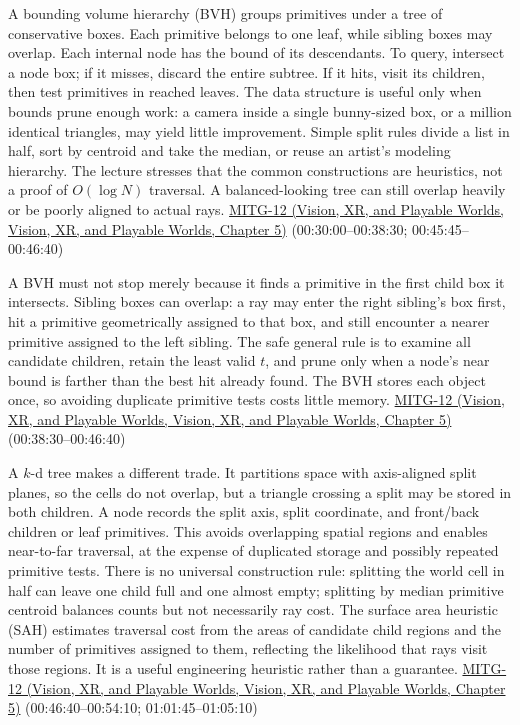 A bounding volume hierarchy (BVH) groups primitives under a tree of conservative boxes. Each primitive belongs to one leaf, while sibling boxes may overlap. Each internal node has the bound of its descendants. To query, intersect a node box; if it misses, discard the entire subtree. If it hits, visit its children, then test primitives in reached leaves. The data structure is useful only when bounds prune enough work: a camera inside a single bunny-sized box, or a million identical triangles, may yield little improvement. Simple split rules divide a list in half, sort by centroid and take the median, or reuse an artist's modeling hierarchy. The lecture stresses that the common constructions are heuristics, not a proof of \(O(\log N)\) traversal. A balanced-looking tree can still overlap heavily or be poorly aligned to actual rays. \href{../07-Vision-XR-and-Playable-Worlds/main.pdf\#nameddest=04-visual-computing-ii-ch036-mitg-12---ray-tracing-ii}{MITG-12 (Vision, XR, and Playable Worlds, Vision, XR, and Playable Worlds, Chapter 5)} (00:30:00--00:38:30; 00:45:45--00:46:40)

A BVH must not stop merely because it finds a primitive in the first child box it intersects. Sibling boxes can overlap: a ray may enter the right sibling's box first, hit a primitive geometrically assigned to that box, and still encounter a nearer primitive assigned to the left sibling. The safe general rule is to examine all candidate children, retain the least valid \(t\), and prune only when a node's near bound is farther than the best hit already found. The BVH stores each object once, so avoiding duplicate primitive tests costs little memory. \href{../07-Vision-XR-and-Playable-Worlds/main.pdf\#nameddest=04-visual-computing-ii-ch036-mitg-12---ray-tracing-ii}{MITG-12 (Vision, XR, and Playable Worlds, Vision, XR, and Playable Worlds, Chapter 5)} (00:38:30--00:46:40)

A \(k\)-d tree makes a different trade. It partitions space with axis-aligned split planes, so the cells do not overlap, but a triangle crossing a split may be stored in both children. A node records the split axis, split coordinate, and front/back children or leaf primitives. This avoids overlapping spatial regions and enables near-to-far traversal, at the expense of duplicated storage and possibly repeated primitive tests. There is no universal construction rule: splitting the world cell in half can leave one child full and one almost empty; splitting by median primitive centroid balances counts but not necessarily ray cost. The surface area heuristic (SAH) estimates traversal cost from the areas of candidate child regions and the number of primitives assigned to them, reflecting the likelihood that rays visit those regions. It is a useful engineering heuristic rather than a guarantee. \href{../07-Vision-XR-and-Playable-Worlds/main.pdf\#nameddest=04-visual-computing-ii-ch036-mitg-12---ray-tracing-ii}{MITG-12 (Vision, XR, and Playable Worlds, Vision, XR, and Playable Worlds, Chapter 5)} (00:46:40--00:54:10; 01:01:45--01:05:10)

